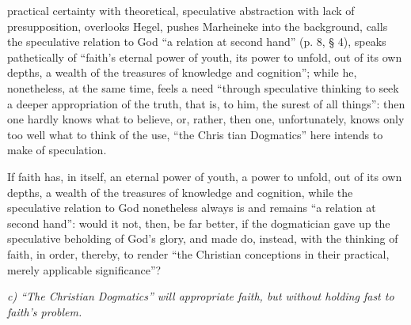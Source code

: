 \documentclass[12pt]{book}
\begin{document}
practical certainty with theoretical, speculative abstraction with lack of presupposition, overlooks Hegel, pushes Marheineke into the background, calls the speculative relation to God ``a relation at second hand'' (p. 8, § 4), speaks pathetically of ``faith's eternal power of youth, its power to unfold, out of its own depths, a wealth of the treasures of knowledge and cognition''; while he, nonetheless, at the same time, feels a need ``through speculative thinking to seek a deeper appropriation of the truth, that is, to him, the surest of all things'': then one hardly knows what to believe, or, rather, then one, unfortunately, knows only too well what to think of the use, ``the Chris\-%
tian Dogmatics'' here intends to make of speculation.

If faith has, in itself, an eternal power of youth, a power to unfold, out of its own depths, a wealth of the treasures of knowledge and cognition, while the speculative relation to God nonetheless always is and remains ``a relation at second hand'': would it not, then, be far better, if the dogmatician gave up the speculative beholding of God's glory, and made do, instead, with the thinking of faith, in order, thereby, to render ``the Christian conceptions in their practical, merely applicable significance''?

\begin{center}
\emph{c) ``The Christian Dogmatics'' will appropriate faith, but without holding fast to faith's problem.}
\end{center}
\end{document}
